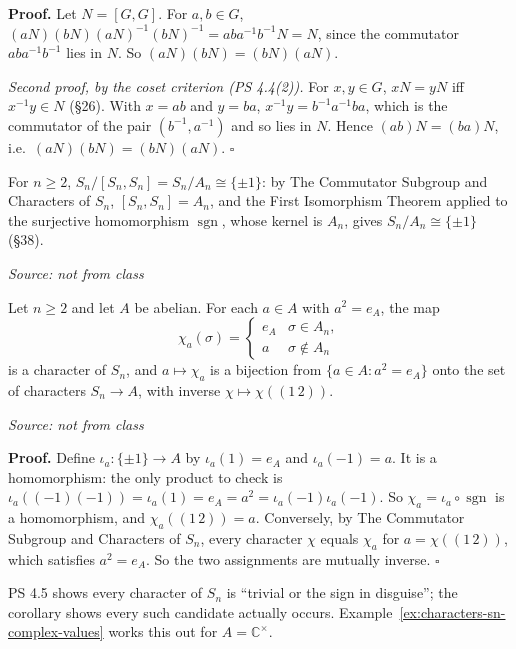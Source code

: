 \documentclass[11pt]{report}
\newcommand{\sgn}{\operatorname{sgn}}
\renewenvironment{proof}[1][Proof]{\noindent\textbf{#1.} }{\hfill$\square$\par\vspace{5pt}}
\newcommand{\srcline}[1]{\par\hfill{\footnotesize\textit{Source: #1}}}
\begin{document}
\begin{proof}
Let $N = [G,G]$. For $a, b \in G$, $(aN)(bN)(aN)^{-1}(bN)^{-1} = aba^{-1}b^{-1}N = N$, since the commutator $aba^{-1}b^{-1}$ lies in $N$. So $(aN)(bN) = (bN)(aN)$.

\emph{Second proof, by the coset criterion (PS 4.4(2)).} For $x, y \in G$, $xN = yN$ iff $x^{-1}y \in N$ (\S 26). With $x = ab$ and $y = ba$, $x^{-1}y = b^{-1}a^{-1}ba$, which is the commutator of the pair $(b^{-1}, a^{-1})$ and so lies in $N$. Hence $(ab)N = (ba)N$, i.e.\ $(aN)(bN) = (bN)(aN)$.
\end{proof}

\begin{exbox}\label{ex:abelianization-sn}
For $n \geq 2$, $S_n/[S_n, S_n] = S_n/A_n \cong \{\pm 1\}$: by The Commutator Subgroup and Characters of $S_n$, $[S_n, S_n] = A_n$, and the First Isomorphism Theorem applied to the surjective homomorphism $\sgn$, whose kernel is $A_n$, gives $S_n/A_n \cong \{\pm 1\}$ (\S 38).
\srcline{not from class}
\end{exbox}

\begin{corbox}\label{cor:every-square-root-ea-gives-character}
Let $n \geq 2$ and let $A$ be abelian. For each $a \in A$ with $a^2 = e_A$, the map
\[ \chi_a(\sigma) = \begin{cases} e_A & \sigma \in A_n, \\ a & \sigma \notin A_n \end{cases} \]
is a character of $S_n$, and $a \mapsto \chi_a$ is a bijection from $\{a \in A : a^2 = e_A\}$ onto the set of characters $S_n \to A$, with inverse $\chi \mapsto \chi((1\,2))$.
\srcline{not from class}
\end{corbox}

\begin{proof}
Define $\iota_a: \{\pm 1\} \to A$ by $\iota_a(1) = e_A$ and $\iota_a(-1) = a$. It is a homomorphism: the only product to check is $\iota_a((-1)(-1)) = \iota_a(1) = e_A = a^2 = \iota_a(-1)\iota_a(-1)$. So $\chi_a = \iota_a \circ \sgn$ is a homomorphism, and $\chi_a((1\,2)) = a$. Conversely, by The Commutator Subgroup and Characters of $S_n$, every character $\chi$ equals $\chi_a$ for $a = \chi((1\,2))$, which satisfies $a^2 = e_A$. So the two assignments are mutually inverse.
\end{proof}

\begin{rembox}\label{rem:characters-sn-completely}
PS 4.5 shows every character of $S_n$ is ``trivial or the sign in disguise''; the corollary shows every such candidate actually occurs. Example~\ref{ex:characters-sn-complex-values} works this out for $A = \mathbb{C}^\times$.
\end{rembox}
\end{document}
